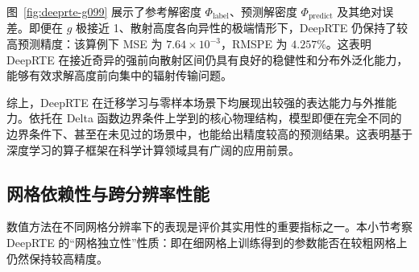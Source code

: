 图~\ref{fig:deeprte-g099} 展示了参考解密度 $\Phi_{\text{label}}$、预测解密度 $\Phi_{\text{predict}}$ 及其绝对误差。即便在 $g$ 极接近 1、散射高度各向异性的极端情形下，DeepRTE 仍保持了较高预测精度：该算例下 MSE 为 $7.64\times 10^{-3}$，RMSPE 为 $4.257\%$。这表明 DeepRTE 在接近奇异的强前向散射区间仍具有良好的稳健性和分布外泛化能力，能够有效求解高度前向集中的辐射传输问题。

综上，DeepRTE 在迁移学习与零样本场景下均展现出较强的表达能力与外推能力。依托在 Delta 函数边界条件上学到的核心物理结构，模型即便在完全不同的边界条件下、甚至在未见过的场景中，也能给出精度较高的预测结果。这表明基于深度学习的算子框架在科学计算领域具有广阔的应用前景。

\subsection{网格依赖性与跨分辨率性能}

数值方法在不同网格分辨率下的表现是评价其实用性的重要指标之一。本小节考察 DeepRTE 的“网格独立性”性质：即在细网格上训练得到的参数能否在较粗网格上仍然保持较高精度。


